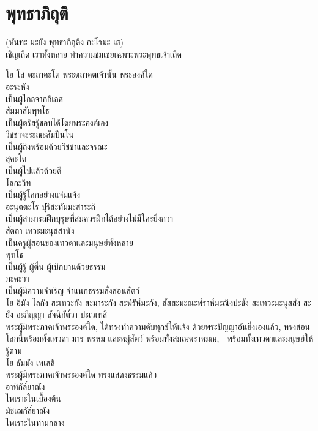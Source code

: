 \documentclass{article}
\begin{document}
\section{พุทธาภิถุติ}
\begin{center}
(หันทะ มะยัง พุทธาภิถุติง กะโรมะ เส)\\
เชิญเถิด เราทั้งหลาย ทำความชมเชยเฉพาะพระพุทธเจ้าเถิด
\end{center}
โย โส ตะถาคะโต\newline
\indent พระตถาคตเจ้านั้น พระองค์ใด\\
อะระหัง\\
\indent เป็นผู้ไกลจากกิเลส\\
สัมมาสัมพุทโธ\\
\indent เป็นผู้ตรัสรู้ชอบได้โดยพระองค์เอง\\
วิชชาจะระณะสัมปันโน\\
\indent เป็นผู้ถึงพร้อมด้วยวิชชาและจรณะ\\
สุคะโต\\
\indent เป็นผู้ไปแล้วด้วยดี\\
โลกะวิท\\
\indent เป็นผู้รู้โลกอย่างแจ่มแจ้ง\\
อะนุตตะโร ปุริสะทัมมะสาระถิ\\
\indent เป็นผู้สามารถฝึกบุรุษที่สมควรฝึกได้อย่างไม่มีใครยิ่งกว่า\\
สัตถา เทวะมะนุสสานัง\\
\indent เป็นครูผู้สอนของเทวดาและมนุษย์ทั้งหลาย\\
พุทโธ\\
\indent เป็นผู้รู้ ผู้ตื่น ผู้เบิกบานด้วยธรรม\\
ภะคะวา\\
\indent เป็นผู้มีความจำเริญ จำแนกธรรมสั่งสอนสัตว์\\
โย อิมัง โลกัง สะเทวะกัง สะมาระกัง สะพ๎รัห๎มะกัง, 
สัสสะมะณะพ๎ราห๎มะณิงปะชัง สะเทวะมะนุสสัง
 สะยัง อะภิญญา สัจฉิกัต๎วา ปะเวเทสิ\\
\indent พระผู้มีพระภาคเจ้าพระองค์ใด, ได้ทรงทำความดับทุกข์ให้แจ้ง 
ด้วยพระปัญญาอันยิ่งเองแล้ว, ทรงสอนโลกนี้พร้อมทั้งเทวดา 
มาร พรหม และหมู่สัตว์ พร้อมทั้งสมณพราหมณ, 
พร้อมทั้งเทวดาและมนุษย์ให้รู้ตาม\\
โย ธัมมัง เทเสสิ\\
\indent พระผู้มีพระภาคเจ้าพระองค์ใด ทรงแสดงธรรมแล้ว\\
อาทิกัล๎ยาณัง\\
\indent ไพเราะในเบื้องต้น\\
มัชเฌกัล๎ยาณัง\\
\indent ไพเราะในท่ามกลาง\\
\end{document}
